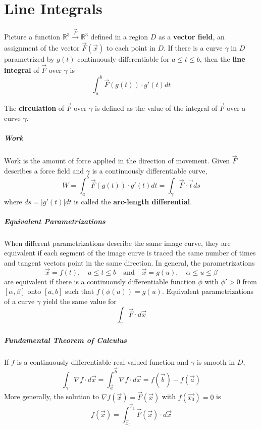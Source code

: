 \documentclass[11pt]{article}
\begin{document}
\section{Line Integrals}
	Picture a function $\mathbb{R}^3 \xrightarrow{\vec{F}} \mathbb{R}^3$ defined in a region $D$ as a \textbf{vector field}, an assignment of the vector $\vec{F}(\vec{x})$ to each point in $D$. If there is a curve $\gamma$ in $D$ parametrized by $g(t)$ continuously differentiable for $a \leq t \leq b$, then the \textbf{line integral} of $\vec{F}$ over $\gamma$ is
	\begin{equation}
		\int_a^b \vec{F}(g(t)) \cdot g'(t)dt
	\end{equation}
	
	The \textbf{circulation} of $\vec{F}$ over $\gamma$ is defined as the value of the integral of $\vec{F}$ over a curve $\gamma$. 
	
	\subparagraph{Work} Work is the amount of force applied in the direction of movement. Given $\vec{F}$ describes a force field and $\gamma$ is a continuously differentiable curve, 
	\begin{equation}
		W = \int_a^b \vec{F}(g(t)) \cdot g'(t)dt = \int_\gamma \vec{F} \cdot \vec{t} ds
	\end{equation}
	where $ds = |g'(t)|dt$ is called the \textbf{arc-length differential}.
	
	\subparagraph{Equivalent Parametrizations} When different parametrizations describe the same image curve, they are equivalent if each segment of the image curve is traced the same number of times and tangent vectors point in the same direction. In general, the parametrizations
	\begin{equation}
		\vec{x} = f(t), \quad a \leq t \leq b \quad \text{and} \quad \vec{x} = g(u), \quad \alpha \leq u \leq \beta
	\end{equation}
	are equivalent if there is a continuously differentiable function $\phi$ with $\phi ' > 0$ from $[\alpha, \beta]$ onto $[a, b]$ such that $f(\phi(u)) = g(u)$. Equivalent parametrizations of a curve $\gamma$ yield the same value for 
	\begin{equation*}
		\int_\gamma \vec{F} \cdot d\vec{x}
	\end{equation*}
	

	\subparagraph{Fundamental Theorem of Calculus} If $f$ is a continuously differentiable real-valued function and $\gamma$ is smooth in $D$,
		\begin{equation}
			\int_\gamma \nabla f \cdot d\vec{x} = \int_{\vec{a}}^{\vec{b}} \nabla f \cdot d\vec{x} = f(\vec{b}) - f(\vec{a})
		\end{equation}
		More generally, the solution to $\nabla f(\vec{x}) = \vec{F}(\vec{x})$ with $f(\vec{x_0}) = 0$ is
		\begin{equation}
			f(\vec{x}) = \int_{\vec{x}_0}^{\vec{x}_1} \vec{F}(\vec{x}) \cdot d\vec{x}
		\end{equation}
		
\end{document}
